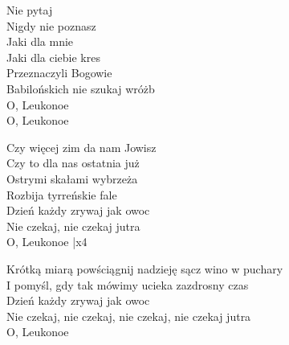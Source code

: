\begin{text}
    Nie pytaj\\
    Nigdy nie poznasz\\
    Jaki dla mnie\\
    Jaki dla ciebie kres\\
    Przeznaczyli Bogowie\\
    Babilońskich nie szukaj wróżb\\
    O, Leukonoe\\
    O, Leukonoe

    Czy więcej zim da nam Jowisz\\
    Czy to dla nas ostatnia już\\
    Ostrymi skałami wybrzeża\\
    Rozbija tyrreńskie fale\\
    Dzień każdy zrywaj jak owoc\\
    Nie czekaj, nie czekaj jutra\\
    O, Leukonoe |x4

    Krótką miarą powściągnij nadzieję sącz wino w puchary\\
    I pomyśl, gdy tak mówimy ucieka zazdrosny czas\\
    Dzień każdy zrywaj jak owoc\\
    Nie czekaj, nie czekaj, nie czekaj, nie czekaj jutra\\
    O, Leukonoe
\end{text}
\begin{chord}

\end{chord}